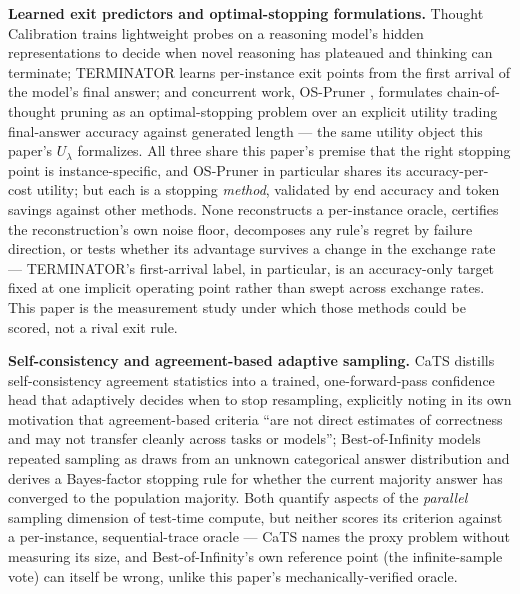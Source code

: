 \documentclass[11pt]{article}
\begin{document}
\textbf{Learned exit predictors and optimal-stopping formulations.} Thought Calibration \citep{ThoughtCalib2505} trains lightweight probes on a reasoning model's hidden representations to decide when novel reasoning has plateaued and thinking can terminate; TERMINATOR \citep{TERMINATOR2603} learns per-instance exit points from the first arrival of the model's final answer; and concurrent work, OS-Pruner \citep{OSPruner2607}, formulates chain-of-thought pruning as an optimal-stopping problem over an explicit utility trading final-answer accuracy against generated length --- the same utility object this paper's $U_\lambda$ formalizes. All three share this paper's premise that the right stopping point is instance-specific, and OS-Pruner in particular shares its accuracy-per-cost utility; but each is a stopping \emph{method}, validated by end accuracy and token savings against other methods. None reconstructs a per-instance oracle, certifies the reconstruction's own noise floor, decomposes any rule's regret by failure direction, or tests whether its advantage survives a change in the exchange rate --- TERMINATOR's first-arrival label, in particular, is an accuracy-only target fixed at one implicit operating point rather than swept across exchange rates. This paper is the measurement study under which those methods could be scored, not a rival exit rule.

\textbf{Self-consistency and agreement-based adaptive sampling.} CaTS \citep{CaTS2607} distills self-consistency agreement statistics into a trained, one-forward-pass confidence head that adaptively decides when to stop resampling, explicitly noting in its own motivation that agreement-based criteria ``are not direct estimates of correctness and may not transfer cleanly across tasks or models''; Best-of-Infinity \citep{BestOfInfinity2607} models repeated sampling as draws from an unknown categorical answer distribution and derives a Bayes-factor stopping rule for whether the current majority answer has converged to the population majority. Both quantify aspects of the \emph{parallel} sampling dimension of test-time compute, but neither scores its criterion against a per-instance, sequential-trace oracle --- CaTS names the proxy problem without measuring its size, and Best-of-Infinity's own reference point (the infinite-sample vote) can itself be wrong, unlike this paper's mechanically-verified oracle.
\end{document}
